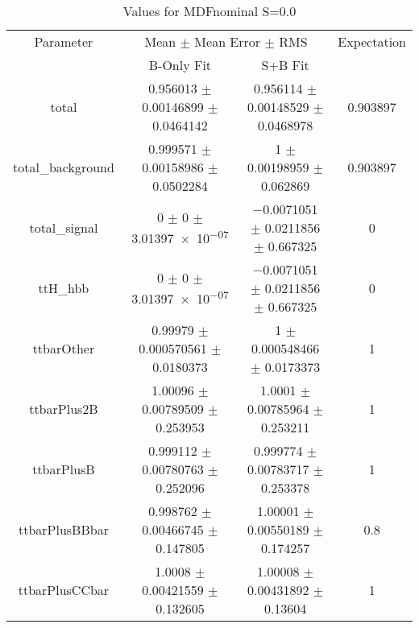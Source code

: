 \begin{table}
\centering
\caption{Values for MDFnominal S=0.0}
\begin{tabular}{cccc}
\toprule
Parameter & \multicolumn{2}{c}{Mean $\pm$ Mean Error $\pm$ RMS} & Expectation\\
 & B-Only Fit & S+B Fit & \\
\midrule
total & \num{0.956013} $\pm$ \num{0.00146899} $\pm$ \num{0.0464142} & \num{0.956114} $\pm$ \num{0.00148529} $\pm$ \num{0.0468978} & \num{0.903897}\\
total\_background & \num{0.999571} $\pm$ \num{0.00158986} $\pm$ \num{0.0502284} & \num{1} $\pm$ \num{0.00198959} $\pm$ \num{0.062869} & \num{0.903897}\\
total\_signal & \num{0} $\pm$ \num{0} $\pm$ \num{3.01397e-07} & \num{-0.0071051} $\pm$ \num{0.0211856} $\pm$ \num{0.667325} & \num{0}\\
ttH\_hbb & \num{0} $\pm$ \num{0} $\pm$ \num{3.01397e-07} & \num{-0.0071051} $\pm$ \num{0.0211856} $\pm$ \num{0.667325} & \num{0}\\
ttbarOther & \num{0.99979} $\pm$ \num{0.000570561} $\pm$ \num{0.0180373} & \num{1} $\pm$ \num{0.000548466} $\pm$ \num{0.0173373} & \num{1}\\
ttbarPlus2B & \num{1.00096} $\pm$ \num{0.00789509} $\pm$ \num{0.253953} & \num{1.0001} $\pm$ \num{0.00785964} $\pm$ \num{0.253211} & \num{1}\\
ttbarPlusB & \num{0.999112} $\pm$ \num{0.00780763} $\pm$ \num{0.252096} & \num{0.999774} $\pm$ \num{0.00783717} $\pm$ \num{0.253378} & \num{1}\\
ttbarPlusBBbar & \num{0.998762} $\pm$ \num{0.00466745} $\pm$ \num{0.147805} & \num{1.00001} $\pm$ \num{0.00550189} $\pm$ \num{0.174257} & \num{0.8}\\
ttbarPlusCCbar & \num{1.0008} $\pm$ \num{0.00421559} $\pm$ \num{0.132605} & \num{1.00008} $\pm$ \num{0.00431892} $\pm$ \num{0.13604} & \num{1}\\
\bottomrule
\end{tabular}
\end{table}